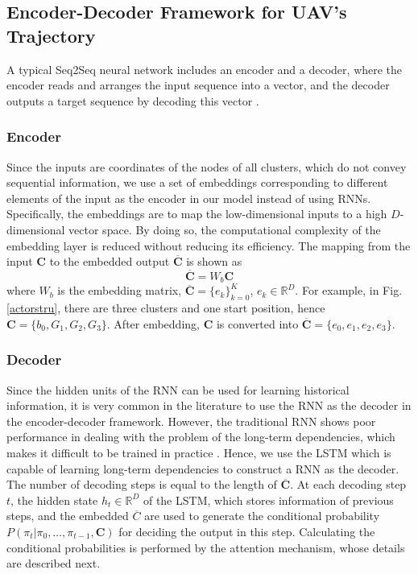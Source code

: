 \documentclass[journal]{IEEEtran}
\begin{document}
    \subsection{Encoder-Decoder Framework for UAV's Trajectory}
     A typical Seq2Seq neural network includes an encoder and a decoder, where the encoder reads and arranges the input sequence into a vector, and the decoder outputs a target sequence by decoding this vector \cite{O. Vinyals}.
    		
    \subsubsection{Encoder}
     Since the inputs are coordinates of the nodes of all clusters, which do not convey sequential information, we use a set of embeddings corresponding to different elements of the input as the encoder in our model instead of using RNNs. Specifically, the embeddings are to map the low-dimensional inputs to a high $D$-dimensional vector space. By doing so, the computational complexity of the embedding layer is reduced without reducing its efficiency. The mapping from the input $\bm{C}$ to the embedded output $\overline{\bm{C}}$ is shown as
    \begin{equation}
        \overline{\bm{C}} = W_b\bm{C}
    \end{equation}
    where $W_b$ is the embedding matrix, $\overline{\bm{C}} = \{e_k\}_{k=0}^K$, $e_k\in\mathbb{R}^D$. For example, in Fig. \ref{actorstru}, there are three clusters and one start position, hence $\bm{C} = \{b_0, G_1, G_2, G_3\}$. After embedding, $\bm{C}$ is converted into  $\overline{\bm{C}} = \{e_0, e_1, e_2, e_3\}$.


    \subsubsection{Decoder}
    Since the hidden units of the RNN can be used for learning historical information, it is very common in the literature to use the RNN as the decoder in the encoder-decoder framework. However, the traditional RNN shows poor performance in dealing with the problem of the long-term dependencies, which makes it difficult to be trained in practice \cite{Y. Zhu}. Hence, we use the LSTM which is capable of learning long-term dependencies to construct a RNN as the decoder. The number of decoding steps is equal to the length of $\overline{\bm{C}}$. At each decoding step $t$, the hidden state $h_t\in \mathbb{R}^{D}$ of the LSTM, which stores information of previous steps, and the embedded $\overline{C}$ are used to generate the conditional probability $P(\pi_t|\pi_0,\dots,\pi_{t-1}, \bm{C})$ for deciding the output in this step. Calculating the conditional probabilities is performed by the attention mechanism, whose details are described next.
\end{document}
